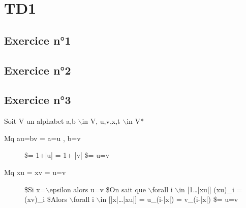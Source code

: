 \documentclass{article}
\begin{document}
 
\hypertarget{td1}{}\section*{{TD1}}\label{td1}

\hypertarget{exercice_n1}{}\subsection*{{Exercice n°1}}\label{exercice_n1}

\hypertarget{exercice_n2}{}\subsection*{{Exercice n°2}}\label{exercice_n2}

\hypertarget{exercice_n3}{}\subsection*{{Exercice n°3}}\label{exercice_n3}

Soit V un alphabet a,b $\backslash$in V, u,v,x,t $\backslash$in V*

\begin{description}

\item[Mq au=bv ={\tt {}} a=u , b=v] \${\tt {}}={\tt {}} 1+|u| = 1+ |v| 
\$={\tt {}} u=v 

\item[Mq xu = xv ={\tt {}} u=v] \$Si x=$\backslash$epsilon alors u=v 
\$On sait que $\backslash$forall i $\backslash$in [1\ldots{}|xu|] (xu)\_i = (xv)\_i 
\$Alors $\backslash$forall i $\backslash$in [|x|\ldots{}|xu|] ={\tt {}} u\_(i-|x|) = v\_(i-|x|) 
\$={\tt {}} u=v 
\end{description}
\end{document}
